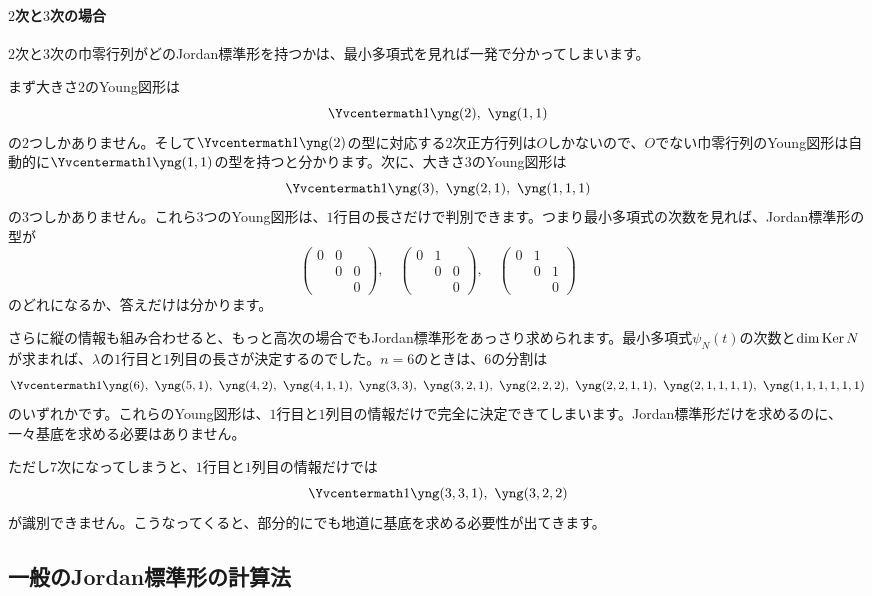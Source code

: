 \paragraph{$2$次と$3$次の場合}

$2$次と$3$次の巾零行列がどのJordan標準形を持つかは、最小多項式を見れば一発で分かってしまいます。

まず大きさ$2$のYoung図形は
\[
\Yvcentermath1 \yng(2),\ \yng(1,1)
\]
の$2$つしかありません。そして$\Yvcentermath1\yng(2)$の型に対応する$2$次正方行列は$O$しかないので、$O$でない巾零行列のYoung図形は自動的に$\Yvcentermath1\yng(1,1)$の型を持つと分かります。次に、大きさ$3$のYoung図形は
\[
\Yvcentermath1 \yng(3),\ \yng(2,1),\ \yng(1,1,1)
\]
の$3$つしかありません。これら$3$つのYoung図形は、$1$行目の長さだけで判別できます。つまり最小多項式の次数を見れば、Jordan標準形の型が
\[
\begin{pmatrix}
0 & 0 \\
 & 0 & 0 \\
 & & 0
\end{pmatrix}, \quad
\begin{pmatrix}
0 & 1 \\
 & 0 & 0 \\
 & & 0
\end{pmatrix}, \quad
\begin{pmatrix}
0 & 1 \\
 & 0 & 1 \\
 & & 0
\end{pmatrix}
\]
のどれになるか、答えだけは分かります。

さらに縦の情報も組み合わせると、もっと高次の場合でもJordan標準形をあっさり求められます。最小多項式$\psi_N(t)$の次数と$\dim \operatorname{Ker} N$が求まれば、$\lambda$の$1$行目と$1$列目の長さが決定するのでした。$n = 6$のときは、$6$の分割は
\[
\Yvcentermath1 \yng(6),\ \yng(5,1),\  \yng(4,2),\  \yng(4,1,1),\ 
\yng(3,3),\  \yng(3,2,1),\  \yng(2,2,2),\  \yng(2,2,1,1),\  \yng(2,1,1,1,1),\  \yng(1,1,1,1,1,1)
\]
のいずれかです。これらのYoung図形は、$1$行目と$1$列目の情報だけで完全に決定できてしまいます。Jordan標準形だけを求めるのに、一々基底を求める必要はありません。

ただし$7$次になってしまうと、$1$行目と$1$列目の情報だけでは
\[
\Yvcentermath1 \yng(3,3,1),\  \yng(3,2,2)
\]
が識別できません。こうなってくると、部分的にでも地道に基底を求める必要性が出てきます。

\subsection{一般のJordan標準形の計算法}

